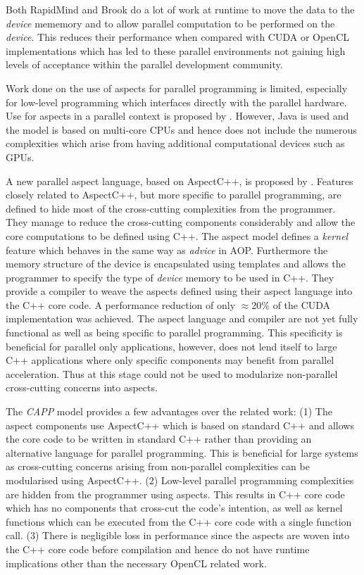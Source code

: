 \documentclass{sig-alternate-05-2015}
\begin{document}
Both RapidMind and Brook do a lot of work at runtime to move the data to 
the \textit{device} mememory and to allow parallel computation to be performed on the
\textit{device}. This
reduces their performance when compared with CUDA or OpenCL implementations 
\cite{rmindperf} which has led to these parallel environments not
gaining high levels of acceptance within the parallel development community.

Work done on the use of aspects for parallel programming is limited, especially
for low-level programming which interfaces directly with the parallel hardware.
Use for aspects in a parallel context is proposed by \cite{jaspect}.
However, Java is used and the model is based on multi-core CPUs and hence does not include the
numerous complexities which arise from having additional computational devices such
as GPUs.

A new parallel aspect language, based on AspectC++, is proposed by
\cite{wang:aosp}. Features closely related to AspectC++, but more specific to
parallel programming, are defined to hide most of the cross-cutting complexities from the
programmer. They manage to reduce the cross-cutting components considerably
and allow the core computations to be defined using C++. The aspect model defines 
a \textit{kernel} feature which behaves in the same way as \textit{advice} in AOP. 
Furthermore the memory structure of the device is encapsulated using templates and allows the
programmer to specify the type of \textit{device} memory to be used in C++. They
provide a compiler  to weave the aspects defined using their aspect language into 
the C++ core code. A performance reduction of only $\approx$20$\%$ of the CUDA
implementation was achieved. 
The aspect language and compiler are not yet fully functional as well as being
specific to parallel programming. This specificity is beneficial for parallel
only applications, however, does not lend itself to large C++ applications
where only specific components may benefit from parallel acceleration. Thus at this
stage could not be used to modularize non-parallel cross-cutting concerns into
aspects.

The \textit{CAPP} model provides a few advantages over the related work:
(1) The aspect components use AspectC++ which is based on standard
C++ and allows the core code to be written in standard C++ rather than providing
an alternative language for parallel programming. This is beneficial for large
systems as cross-cutting concerns arising from non-parallel complexities can be
modularised using AspectC++. (2) Low-level parallel programming complexities are 
hidden from the programmer using aspects. This results in C++ core code which has no
components that cross-cut the code's intention, as well as kernel functions which
can be executed from the C++ core code with a single function call. (3) There is 
negligible loss in performance since the aspects are woven into the C++ core
code before compilation and hence do not have runtime implications other than
the necessary OpenCL related work.
\end{document}
